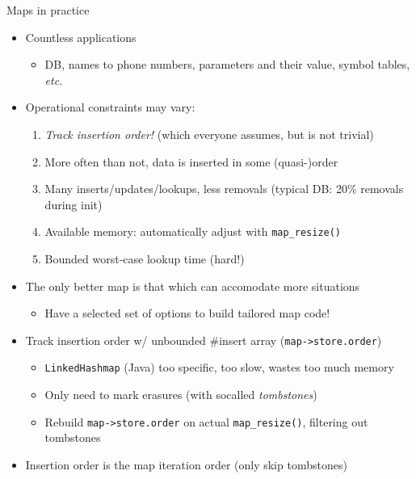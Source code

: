 \begin{frame}[fragile]{Maps in practice}

  \begin{itemize}
  \item Countless applications
    \begin{itemize}
    \item DB, names to phone numbers, parameters and their value, symbol tables, {\em etc.}
    \end{itemize}
  \item Operational constraints may vary:
    \begin{enumerate}
    \item {\em Track insertion order!} (which everyone assumes, but is not trivial)
    \item More often than not, data is inserted in some (quasi-)order
    \item Many inserts/updates/lookups, less removals (typical DB: 20\% removals during init)
    \item Available memory: automatically adjust with \lstinline{map_resize()}
    \item Bounded worst-case lookup time (hard!)
    \end{enumerate}
  \item The only better map is that which can accomodate more situations
    \begin{itemize}
    \item Have a selected set of options to build tailored map code!
    \end{itemize}
  \item Track insertion order w/ unbounded \#insert array (\lstinline{map->store.order})
    \begin{itemize}
    \item \lstinline{LinkedHashmap} (Java) too specific, too slow, wastes too much memory
    \item Only need to mark erasures (with socalled {\em tombstones})
    \item Rebuild \lstinline{map->store.order} on actual \lstinline{map_resize()}, filtering out tombstones
    \end{itemize}
    \item Insertion order is the map iteration order (only skip tombstones)
  \end{itemize}
  
\end{frame}


